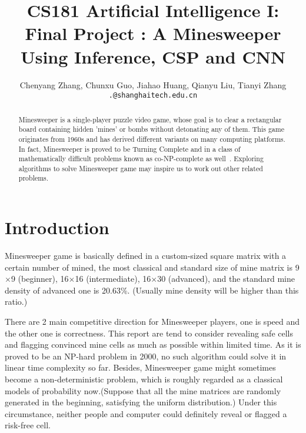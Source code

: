 \documentclass[10pt,twocolumn,letterpaper]{article}
\begin{document}
\title{CS181 Artificial Intelligence I: \\ Final Project : A Minesweeper Using Inference,  CSP and CNN}

\author{Chenyang Zhang, Chunxu Guo, Jiahao Huang, Qianyu Liu, Tianyi Zhang\\

{\tt\small .@shanghaitech.edu.cn}
}

\maketitle

\begin{abstract}
Minesweeper is a single-player puzzle video game, whose goal is to clear a rectangular board containing hidden 'mines' or bombs without detonating any of them. This game originates from 1960s and has derived different variants on many computing platforms. In fact, Minesweeper is proved to be Turning Complete and in a class of mathematically difficult problems known as co-NP-complete as well~\cite{coNP}. Exploring algorithms to solve Minesweeper game may inspire us to work out other related problems.
\end{abstract}


\section{Introduction}
Minesweeper game is basically defined in a custom-sized square matrix with a certain number of mined, the most classical and standard size of mine matrix is 9$\times$9 (beginner),  16$\times$16 (intermediate), 16$\times$30 (advanced), and the standard mine density of advanced one is 20.63\%. (Usually mine density will be higher than this ratio.) 

There are 2 main competitive direction for Minesweeper players, one is speed and the other one is correctness. This report are tend to consider revealing safe cells and flagging convinced mine cells as much as possible within limited time. As it is proved to be an NP-hard problem in 2000, no such algorithm could solve it in linear time complexity so far. Besides, Minesweeper game might sometimes become a non-deterministic problem, which is roughly regarded as a classical models of probability now.(Suppose that all the mine matrices are randomly  generated in the beginning, satisfying the uniform distribution.) Under this circumstance, neither people and computer could definitely reveal or flagged a risk-free cell.
\end{document}
